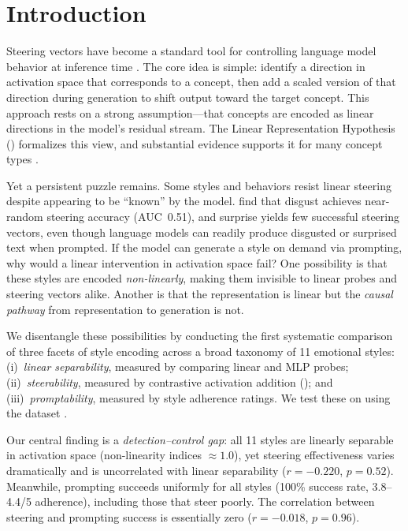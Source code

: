 \section{Introduction}
\label{sec:intro}

Steering vectors have become a standard tool for controlling language model behavior at inference time \citep{turner2023steering, rimsky2024steering}. The core idea is simple: identify a direction in activation space that corresponds to a concept, then add a scaled version of that direction during generation to shift output toward the target concept. This approach rests on a strong assumption---that concepts are encoded as linear directions in the model's residual stream. The Linear Representation Hypothesis (\lrh) formalizes this view, and substantial evidence supports it for many concept types \citep{park2023linear, jiang2024origins}.

Yet a persistent puzzle remains. Some styles and behaviors resist linear steering despite appearing to be ``known'' by the model. \citet{konen2024style} find that disgust achieves near-random steering accuracy (AUC~0.51), and surprise yields few successful steering vectors, even though language models can readily produce disgusted or surprised text when prompted. If the model can generate a style on demand via prompting, why would a linear intervention in activation space fail? One possibility is that these styles are encoded \emph{non-linearly}, making them invisible to linear probes and steering vectors alike. Another is that the representation is linear but the \emph{causal pathway} from representation to generation is not.

We disentangle these possibilities by conducting the first systematic comparison of three facets of style encoding across a broad taxonomy of 11 emotional styles: (i)~\emph{linear separability}, measured by comparing linear and MLP probes; (ii)~\emph{steerability}, measured by contrastive activation addition (\caa); and (iii)~\emph{promptability}, measured by style adherence ratings. We test these on \pythia using the \goemotions dataset \citep{demszky2020goemotions}.

Our central finding is a \emph{detection--control gap}: all 11 styles are linearly separable in activation space (non-linearity indices $\approx 1.0$), yet steering effectiveness varies dramatically and is uncorrelated with linear separability ($r = -0.220$, $p = 0.52$). Meanwhile, prompting succeeds uniformly for all styles (100\% success rate, 3.8--4.4/5 adherence), including those that steer poorly. The correlation between steering and prompting success is essentially zero ($r = -0.018$, $p = 0.96$).

